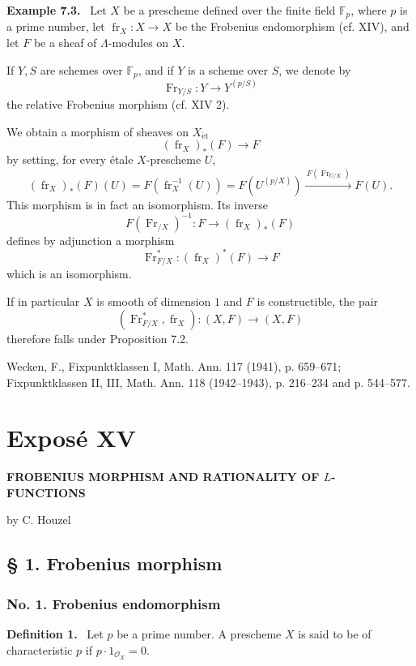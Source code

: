 \documentclass[11pt]{article}
\newenvironment{statement}[1]{\par\medskip\noindent\textbf{#1.}\ }{\par\medskip}
\providecommand{\et}{\mathrm{\acute{e}t}}
\providecommand{\OO}{\mathcal{O}}
\providecommand{\fr}{\operatorname{fr}}
\providecommand{\Fr}{\operatorname{Fr}}
\providecommand{\Fr}{\operatorname{Fr}}
\providecommand{\fr}{\operatorname{fr}}
\providecommand{\et}{\acute{e}t}
\begin{document}
\begin{statement}{Example 7.3}
Let $X$ be a prescheme defined over the finite field $\mathbb F_p$, where $p$ is a prime number, let $\fr_X:X\to X$ be the Frobenius endomorphism (cf. XIV), and let $F$ be a sheaf of $\Lambda$-modules on $X$.

If $Y,S$ are schemes over $\mathbb F_p$, and if $Y$ is a scheme over $S$, we denote by
\[
\Fr_{Y/S}:Y\longrightarrow Y^{(p/S)}
\]
the relative Frobenius morphism (cf. XIV 2).

We obtain a morphism of sheaves on $X_{\et}$
\[
(\fr_X)_*(F)\longrightarrow F
\]
by setting, for every étale $X$-prescheme $U$,
\[
(\fr_X)_*(F)(U)=F(\fr_X^{-1}(U))=F(U^{(p/X)})
 \xrightarrow{\,F(\Fr_{U/X})\,}F(U).
\]
This morphism is in fact an isomorphism. Its inverse
\[
F(\Fr_{/X})^{-1}:F\longrightarrow (\fr_X)_*(F)
\]
defines by adjunction a morphism
\[
\Fr_{F/X}^*:(\fr_X)^*(F)\longrightarrow F
\]
which is an isomorphism.

If in particular $X$ is smooth of dimension $1$ and $F$ is constructible, the pair
\[
(\Fr_{F/X}^*,\fr_X):(X,F)\longrightarrow (X,F)
\]
therefore falls under Proposition 7.2.
\end{statement}

\noindent[1] Wecken, F., Fixpunktklassen I, Math. Ann. 117 (1941), p. 659--671; Fixpunktklassen II, III, Math. Ann. 118 (1942--1943), p. 216--234 and p. 544--577.

\section*{Exposé XV}
\begin{center}
\Large\bfseries FROBENIUS MORPHISM AND RATIONALITY OF $L$-FUNCTIONS

\medskip
by C. Houzel
\end{center}

\subsection*{§ 1. Frobenius morphism}

\subsubsection*{No. 1. Frobenius endomorphism}

\begin{statement}{Definition 1}
Let $p$ be a prime number. A prescheme $X$ is said to be of characteristic $p$ if $p\cdot 1_{\OO_X}=0$.
\end{statement}
\end{document}
